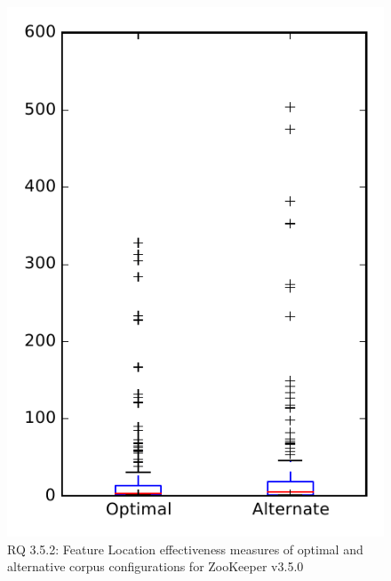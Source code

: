 
\begin{figure}
\centering
\includegraphics[height=0.4\textheight]{figures/combo/flt_rq2_zookeeper}
\caption{RQ 3.5.2: Feature Location effectiveness measures of optimal and alternative corpus configurations for ZooKeeper v3.5.0}
\label{fig:combo:flt:rq2:zookeeper}
\end{figure}
